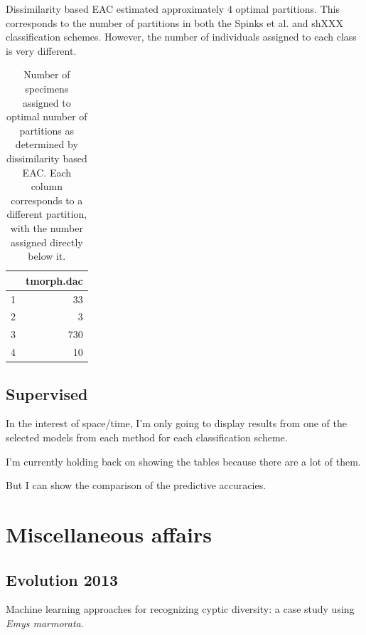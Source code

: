 \documentclass{article}\usepackage{graphicx, color}
\begin{document}
Dissimilarity based EAC estimated approximately 4 optimal partitions. This corresponds to the number of partitions in both the Spinks et al. and shXXX classification schemes. However, the number of individuals assigned to each class is very different.

\begin{table}[ht]
\begin{center}
\begin{tabular}{rr}
  \hline
 & tmorph.dac \\ 
  \hline
1 &  33 \\ 
  2 &   3 \\ 
  3 & 730 \\ 
  4 &  10 \\ 
   \hline
\end{tabular}
\caption{Number of specimens assigned to optimal number of partitions as determined by dissimilarity based EAC. Each column corresponds to a different partition, with the number assigned directly below it.}
\label{tab:dac}
\end{center}
\end{table}







\subsection{Supervised}

In the interest of space/time, I'm only going to display results from one of the selected models from each method for each classification scheme.










I'm currently holding back on showing the tables because there are a lot of them.

But I can show the comparison of the predictive accuracies.




\section{Miscellaneous affairs}
\subsection{Evolution 2013}
Machine learning approaches for recognizing cyptic diversity: a case study using \textit{Emys marmorata}.
\end{document}
